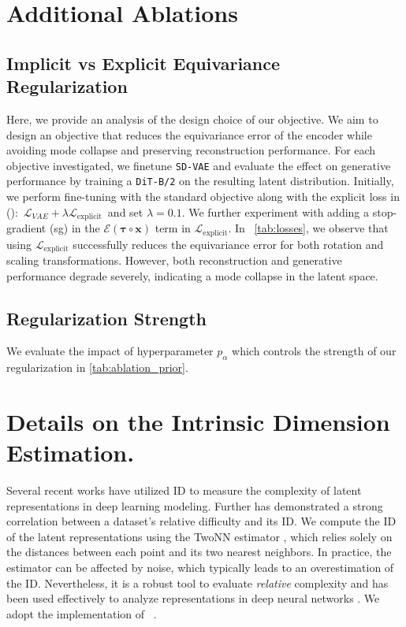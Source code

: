 
\section{Additional Ablations}
\label{more_ablations}


\subsection{Implicit vs Explicit Equivariance Regularization}
\label{sec:appenidx_exp_imp}

Here, we provide an analysis of the design choice of our objective. We aim to design an objective that reduces the equivariance error of the encoder while avoiding mode collapse and preserving reconstruction performance. For each objective investigated, we finetune \texttt{SD-VAE} and evaluate the effect on generative performance by training a \texttt{DiT-B/2} on the resulting latent distribution. 
Initially, we perform fine-tuning with the standard objective along with the explicit loss in ():\mbox{ $\mathcal{L}_{VAE} +   \lambda  \mathcal{L}_{\text{explicit}}$ }and set $\lambda=0.1$. 
We further experiment with adding a stop-gradient (sg) in the $\mathcal{E}(\mathbf{\tau \circ x})$ term in $\mathcal{L}_{\text{explicit}}$.
In ~\autoref{tab:losses}, we observe that using $\mathcal{L}_{\text{explicit}}$ successfully reduces the equivariance error for both rotation and scaling transformations.  However, both reconstruction and generative performance degrade severely, indicating a mode collapse in the latent space. 






\subsection{Regularization Strength}
We evaluate the impact of hyperparameter $p_{\alpha}$ which controls the strength of our regularization  in \autoref{tab:ablation_prior}. 
\label{sec:appendix_prior}



\section{Details on the Intrinsic Dimension Estimation.}
\label{sec:appendix_id}
Several recent works \cite{valeriani2023geometry, kvinge2023exploring, cheng2023bridging} have utilized ID to measure the complexity of latent representations in deep learning modeling. 
  Further \citet{pope2021the} has demonstrated a strong correlation between a dataset’s relative difficulty and its ID. 
We compute the ID of the latent representations using the TwoNN estimator \cite{facco2017estimating}, which relies solely on the distances between each point and its two nearest neighbors.
In practice, the  estimator can be affected by noise, which
typically leads to an overestimation of the ID. Nevertheless, it is a robust tool to evaluate \emph{relative} complexity and has been used
effectively to analyze representations in deep neural networks \cite{valeriani2023geometry}. We adopt the  implementation of ~\cite{glielmo2022dadapy}.



